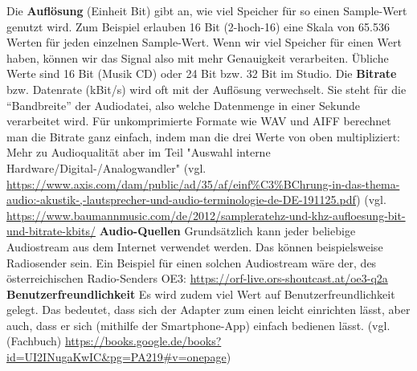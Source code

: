 \documentclass[11pt, twoside]{article}
\begin{document}
\glqq Die \textbf{Auflösung} (Einheit Bit) gibt an, wie viel Speicher für so einen Sample-Wert genutzt wird. Zum Beispiel erlauben 16 Bit (2-hoch-16) eine Skala von 65.536 Werten für jeden einzelnen Sample-Wert. Wenn wir viel Speicher für einen Wert haben, können wir das Signal also mit mehr Genauigkeit verarbeiten. Übliche Werte sind 16 Bit (Musik CD) oder 24 Bit bzw. 32 Bit im Studio.\grqq{}
\vspace{4mm}\newline
\glqq Die \textbf{Bitrate} bzw. Datenrate (kBit/s) wird oft mit der Auflösung verwechselt. Sie steht für die “Bandbreite” der Audiodatei, also welche Datenmenge in einer Sekunde verarbeitet wird. Für unkomprimierte Formate wie WAV und AIFF berechnet man die Bitrate ganz einfach, indem man die drei Werte von oben multipliziert: \grqq{}\newline
Mehr zu Audioqualität aber im Teil "Auswahl interne Hardware/Digital-/Analogwandler"
\vspace{4mm} \newline
(vgl. \url{https://www.axis.com/dam/public/ad/35/af/einf%C3%BChrung-in-das-thema-audio:-akustik-,-lautsprecher-und-audio-terminologie-de-DE-191125.pdf}) 
\newline
(vgl. \url{https://www.baumannmusic.com/de/2012/sampleratehz-und-khz-aufloesung-bit-und-bitrate-kbits/}
\vspace{4mm}\newline
\textbf{Audio-Quellen}\newline
Grundsätzlich kann jeder beliebige Audiostream aus dem Internet verwendet werden. Das können beispielsweise Radiosender sein.
Ein Beispiel für einen solchen Audiostream wäre der, des österreichischen Radio-Senders \glqq OE3\grqq{}: \newline
\url{https://orf-live.ors-shoutcast.at/oe3-q2a}
\vspace{4mm}\newline
\textbf{Benutzerfreundlichkeit}\newline
Es wird zudem viel Wert auf Benutzerfreundlichkeit gelegt. Das bedeutet, dass sich der Adapter zum einen leicht einrichten lässt, aber auch, dass er sich (mithilfe der Smartphone-App) einfach bedienen lässt.
\vspace{4mm} \newline
(vgl. (Fachbuch) \url{https://books.google.de/books?id=UI2INugaKwIC&pg=PA219#v=onepage})
\end{document}

